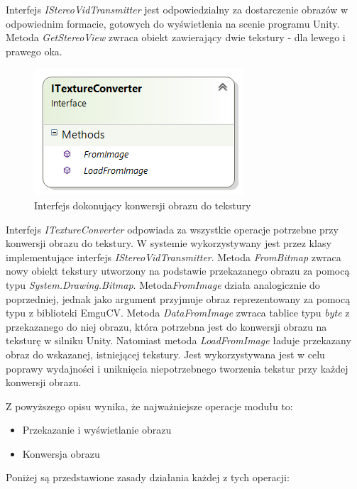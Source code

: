\documentclass[a4paper,11pt,twoside]{report}
\theoremstyle{definition}
\begin{document}
Interfejs \textit{IStereoVidTransmitter} jest odpowiedzialny za dostarczenie obrazów w odpowiednim formacie, gotowych do wyświetlenia na scenie programu Unity. Metoda \textit{GetStereoView} zwraca obiekt zawierający dwie tekstury - dla lewego i prawego oka. 

\begin{figure}[h]
\centering
\includegraphics[scale=0.9]{images/ITextureConverter}
\caption[Konwersja diagram]{Interfejs dokonujący konwersji obrazu do tekstury}
\end{figure}

\begin{minipage}{\linewidth}
Interfejs \textit{ITextureConverter} odpowiada za wszystkie operacje potrzebne przy konwersji obrazu do tekstury. W systemie wykorzystywany jest przez klasy implementujące interfejs \textit{IStereoVidTransmitter}. Metoda \textit{FromBitmap} zwraca nowy obiekt tekstury utworzony na podstawie przekazanego obrazu za pomocą typu \textit{System.Drawing.Bitmap}. Metoda\textit{FromImage} działa analogicznie do poprzedniej, jednak jako argument przyjmuje obraz reprezentowany za pomocą typu z biblioteki EmguCV.
Metoda \textit{DataFromImage} zwraca tablice typu \textit{byte} z przekazanego do niej obrazu, która potrzebna jest do konwersji obrazu na teksturę w silniku Unity. Natomiast metoda \textit{LoadFromImage}  ładuje przekazany obraz do wskazanej, istniejącej tekstury. Jest wykorzystywana jest w celu poprawy wydajności i uniknięcia niepotrzebnego tworzenia tekstur przy każdej konwersji obrazu.
\end{minipage}

Z powyższego opisu wynika, że najważniejsze operacje modułu to:
\begin{itemize}
\item Przekazanie i wyświetlanie obrazu
\item Konwersja obrazu
\end{itemize}

Poniżej są przedstawione zasady działania każdej z tych operacji:
\end{document}
